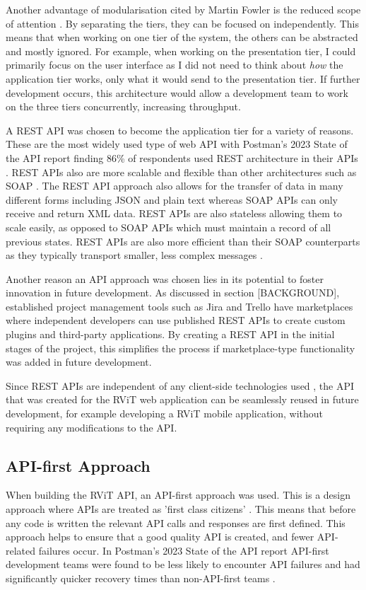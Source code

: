 \documentclass[l4proj.tex]{subfiles}
\begin{document}
Another advantage of modularisation cited by Martin Fowler is the reduced scope of attention \cite{Fowler2015}. By separating the tiers, they can be focused on independently. This means that when working on one tier of the system, the others can be abstracted and mostly ignored. For example, when working on the presentation tier, I could primarily focus on the user interface as I did not need to think about \textit{how} the application tier works, only what it would send to the presentation tier. If further development occurs, this architecture would allow a development team to work on the three tiers concurrently, increasing throughput.

A REST API was chosen to become the application tier for a variety of reasons. These are the most widely used type of web API with Postman's 2023 State of the API report finding 86\% of respondents used REST architecture in their APIs \cite{Postman2023}. REST APIs also are more scalable and flexible than other architectures such as SOAP \cite{AWS}. The REST API approach also allows for the transfer of data in many different forms including JSON and plain text whereas SOAP APIs can only receive and return XML data. REST APIs are also stateless allowing them to scale easily, as opposed to SOAP APIs which must maintain a record of all previous states. REST APIs are also more efficient than their SOAP counterparts as they typically transport smaller, less complex messages \cite{AWS}.

Another reason an API approach was chosen lies in its potential to foster innovation in future development. As discussed in section [BACKGROUND], established project management tools such as Jira and Trello have marketplaces where independent developers can use published REST APIs to create custom plugins and third-party applications. By creating a REST API in the initial stages of the project, this simplifies the process if marketplace-type functionality was added in future development. 

Since REST APIs are independent of any client-side technologies used \cite{PostmanBlog2023}, the API that was created for the RViT web application can be seamlessly reused in future development, for example developing a RViT mobile application, without requiring any modifications to the API. 


\subsection{API-first Approach}
When building the RViT API, an API-first approach was used. This is a design approach where APIs are treated as 'first class citizens' \cite{Wagner(Swagger)}. This means that before any code is written the relevant API calls and responses are first defined. This approach helps to ensure that a good quality API is created, and fewer API-related failures occur. In Postman's 2023 State of the API report API-first development teams were found to be less likely to encounter API failures and had significantly quicker recovery times than non-API-first teams \cite{PostmanAPIFirst}. 
\end{document}
